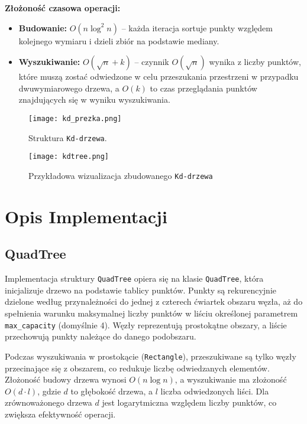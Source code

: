 \documentclass[12pt]{article}
\begin{document}
\textbf{Złożoność czasowa operacji:}
\begin{itemize}
    \item \textbf{Budowanie:} \(O(n \log^2 n)\) -- każda iteracja sortuje punkty względem kolejnego wymiaru i dzieli zbiór na podstawie mediany.
    \item \textbf{Wyszukiwanie:} \(O(\sqrt{n} + k)\) -- czynnik \(O(\sqrt{n})\) wynika z liczby punktów, które muszą zostać odwiedzone w celu przeszukania przestrzeni w przypadku dwuwymiarowego drzewa, a \(O(k)\) to czas przeglądania punktów znajdujących się w wyniku wyszukiwania.
\end{itemize}

\begin{figure}[h]
    \centering
    \texttt{[image: kd\_prezka.png]}
    \caption{Struktura \texttt{Kd-drzewa}.}
\end{figure}
\begin{figure}[h]
    \centering
    \texttt{[image: kdtree.png]}
    \caption{Przykładowa wizualizacja zbudowanego \texttt{Kd-drzewa}}
    \label{fig:kdtree}
\end{figure}
\pagebreak

\section{Opis Implementacji}

\subsection{QuadTree}

Implementacja struktury \texttt{QuadTree} opiera się na klasie \texttt{QuadTree}, która inicjalizuje drzewo na podstawie tablicy punktów. Punkty są rekurencyjnie dzielone według przynależności do jednej z czterech ćwiartek obszaru węzła, aż do spełnienia warunku maksymalnej liczby punktów w liściu określonej parametrem \texttt{max\_capacity} (domyślnie 4). Węzły reprezentują prostokątne obszary, a liście przechowują punkty należące do danego podobszaru.

\noindent Podczas wyszukiwania w prostokącie (\texttt{Rectangle}), przeszukiwane są tylko węzły przecinające się z obszarem, co redukuje liczbę odwiedzanych elementów. Złożoność budowy drzewa wynosi \( O(n \log n) \), a wyszukiwanie ma złożoność \( O(d \cdot l) \), gdzie \( d \) to głębokość drzewa, a \( l \) liczba odwiedzonych liści. Dla zrównoważonego drzewa \( d \) jest logarytmiczna względem liczby punktów, co zwiększa efektywność operacji.
\end{document}
